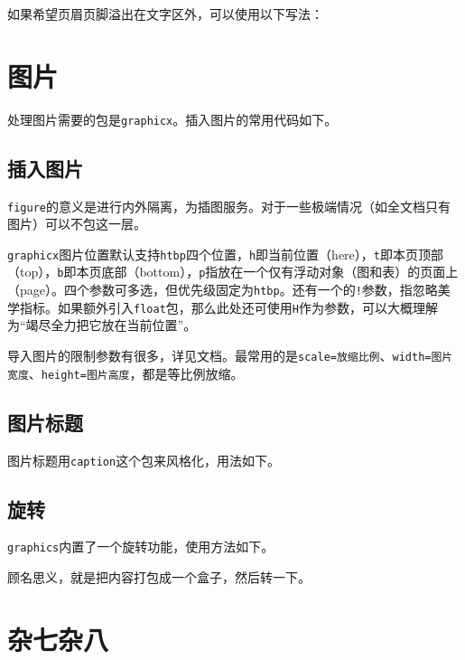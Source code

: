 \documentclass[10pt,openany]{book}
\begin{document}
\begin{sloppypar}
    如果希望页眉页脚溢出在文字区外，可以使用以下写法：

    

    \chapter{图片}

    处理图片需要的包是\texttt{graphicx}。插入图片的常用代码如下。

    \section{插入图片}

    

    \texttt{figure}的意义是进行内外隔离，为插图服务。对于一些极端情况（如全文档只有图片）可以不包这一层。

    \texttt{graphicx}图片位置默认支持\texttt{htbp}四个位置，\texttt{h}即当前位置（here），\texttt{t}即本页顶部（top），\texttt{b}即本页底部（bottom），\texttt{p}指放在一个仅有浮动对象（图和表）的页面上（page）。四个参数可多选，但优先级固定为\texttt{htbp}。还有一个的\texttt{!}参数，指忽略美学指标。如果额外引入\texttt{float}包，那么此处还可使用\texttt{H}作为参数，可以大概理解为“竭尽全力把它放在当前位置”。

    导入图片的限制参数有很多，详见文档。最常用的是\texttt{scale=放缩比例}、\texttt{width=图片宽度}、\texttt{height=图片高度}，都是等比例放缩。

    \section{图片标题}

    图片标题用\texttt{caption}这个包来风格化，用法如下。

    

    \section{旋转}

    \texttt{graphics}内置了一个旋转功能，使用方法如下。

    

    顾名思义，就是把内容打包成一个盒子，然后转一下。

    \chapter{杂七杂八}


\end{sloppypar}
\end{document}
